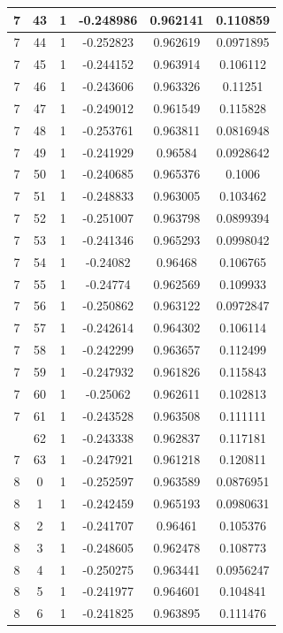 \documentclass[12pt,a4paper]{article}
\numberwithin{equation}{section}
\numberwithin{figure}{section}
\numberwithin{table}{section}
\begin{document}
\begin{longtable}{|c|c|c|c|c|c|}
7 & 43 & 1 & -0.248986 & 0.962141 & 0.110859 \\ \hline
7 & 44 & 1 & -0.252823 & 0.962619 & 0.0971895 \\ \hline
7 & 45 & 1 & -0.244152 & 0.963914 & 0.106112 \\ \hline
7 & 46 & 1 & -0.243606 & 0.963326 & 0.11251 \\ \hline
7 & 47 & 1 & -0.249012 & 0.961549 & 0.115828 \\ \hline
7 & 48 & 1 & -0.253761 & 0.963811 & 0.0816948 \\ \hline
7 & 49 & 1 & -0.241929 & 0.96584 & 0.0928642 \\ \hline
7 & 50 & 1 & -0.240685 & 0.965376 & 0.1006 \\ \hline
7 & 51 & 1 & -0.248833 & 0.963005 & 0.103462 \\ \hline
7 & 52 & 1 & -0.251007 & 0.963798 & 0.0899394 \\ \hline
7 & 53 & 1 & -0.241346 & 0.965293 & 0.0998042 \\ \hline
7 & 54 & 1 & -0.24082 & 0.96468 & 0.106765 \\ \hline
7 & 55 & 1 & -0.24774 & 0.962569 & 0.109933 \\ \hline
7 & 56 & 1 & -0.250862 & 0.963122 & 0.0972847 \\ \hline
7 & 57 & 1 & -0.242614 & 0.964302 & 0.106114 \\ \hline
7 & 58 & 1 & -0.242299 & 0.963657 & 0.112499 \\ \hline
7 & 59 & 1 & -0.247932 & 0.961826 & 0.115843 \\ \hline
7 & 60 & 1 & -0.25062 & 0.962611 & 0.102813 \\ \hline
7 & 61 & 1 & -0.243528 & 0.963508 & 0.111111 \\ \hline
\pagebreak
7 & 62 & 1 & -0.243338 & 0.962837 & 0.117181 \\ \hline
7 & 63 & 1 & -0.247921 & 0.961218 & 0.120811 \\ \hline
8 & 0 & 1 & -0.252597 & 0.963589 & 0.0876951 \\ \hline
8 & 1 & 1 & -0.242459 & 0.965193 & 0.0980631 \\ \hline
8 & 2 & 1 & -0.241707 & 0.96461 & 0.105376 \\ \hline
8 & 3 & 1 & -0.248605 & 0.962478 & 0.108773 \\ \hline
8 & 4 & 1 & -0.250275 & 0.963441 & 0.0956247 \\ \hline
8 & 5 & 1 & -0.241977 & 0.964601 & 0.104841 \\ \hline
8 & 6 & 1 & -0.241825 & 0.963895 & 0.111476 \\ \hline

\end{longtable}
\end{document}
